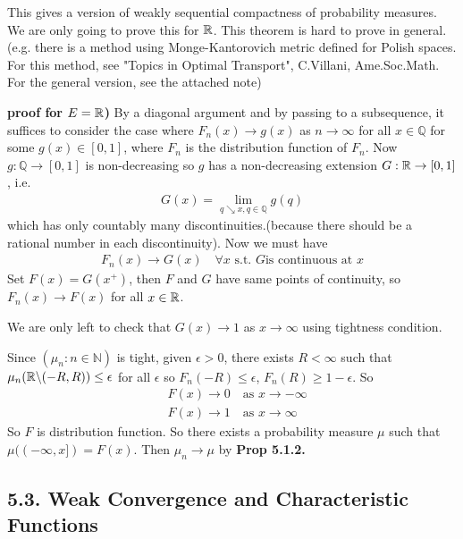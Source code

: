 \documentclass[10pt,a4paper]{report}
\newenvironment{proof}
{\begin{changemargin}{1cm}{0.5cm} 
	}%
	{\end{changemargin}
}
\begin{document}
This gives a version of weakly sequential compactness of probability measures. We are only going to prove this for $\mathbb{R}$. This theorem is hard to prove in general.(e.g. there is a method using Monge-Kantorovich metric defined for Polish spaces. For this method, see "Topics in Optimal Transport", C.Villani, Ame.Soc.Math. For the general version, see the attached note)
\begin{proof}
\textbf{proof for $E=\mathbb{R}$) } By a diagonal argument and by passing to a subsequence, it suffices to consider the case where $F_n(x) \rightarrow g(x)$ as $n\rightarrow \infty$ for all $x\in \mathbb{Q}$ for some $g(x) \in [0,1]$, where $F_n$ is the distribution function of $F_n$. Now $g: \mathbb{Q} \rightarrow [0,1]$ is non-decreasing so $g$ has a non-decreasing extension $G : \mathbb{R} \rightarrow [0,1]$, i.e.
\begin{align*}
G(x) = \lim_{q\searrow x , q\in \mathbb{Q}} g(q)
\end{align*}
which has only countably many discontinuities.(because there should be a rational number in each discontinuity). Now we must have
\begin{align*}
F_n(x) \rightarrow G(x) \quad \forall x \text{ s.t. }G \text{is continuous at }x
\end{align*}
Set $F(x) = G(x^+)$, then $F$ and $G$ have same points of continuity, so $F_n(x) \rightarrow F(x)$ for all $x\in \mathbb{R}$. 

\quad We are only left to check that $G(x) \rightarrow 1$ as $x\rightarrow \infty$ using tightness condition.

\quad Since $(\mu_n : n\in \mathbb{N})$ is tight, given $\epsilon >0$, there exists $R < \infty$ such that $\mu_n (\mathbb{R} \backslash(-R,R)) \leq\epsilon$ for all $\epsilon$ so $F_n(-R) \leq \epsilon$, $F_n(R) \geq 1-\epsilon$. So
\begin{align*}
& F(x) \rightarrow 0 \quad \text{as } x\rightarrow -\infty \\
& F(x) \rightarrow 1 \quad \text{as } x\rightarrow \infty 
\end{align*}
So $F$ is distribution function. So there exists a probability measure $\mu$ such that $\mu((-\infty,x]) = F(x)$. Then $\mu_n \rightarrow \mu$ by \textbf{Prop 5.1.2.}

\eop
\end{proof}
\s

\subsection*{5.3. Weak Convergence and Characteristic Functions}
\end{document}
